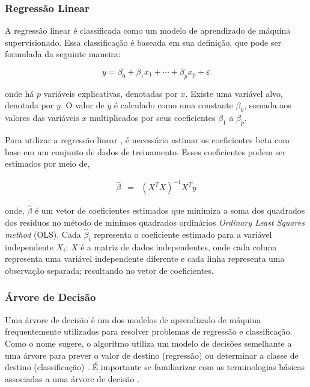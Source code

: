  
 \subsubsection{Regress\~ao Linear}
 
A regressão linear é classificada como um modelo de aprendizado de máquina supervisionado. Essa classificação é baseada em sua definição, que pode ser formulada da seguinte maneira:
 
 \begin{equation}
 	y = \beta_0 + \beta_1 x_1 + \cdots + \beta_p x_p + \varepsilon \label{eq:lr}
 \end{equation}
 
 \noindent onde há $p$ variáveis explicativas, denotadas por $x$. Existe uma variável alvo, denotada por $y$. O valor de $y$ é calculado como uma constante $\beta_0$, somada aos valores das variáveis $x$ multiplicados por seus coeficientes $\beta_1$ a $\beta_p$.
 
 
 Para utilizar a regressão linear \cite{korstanje2021}, é necessário estimar os coeficientes beta com base em um conjunto de dados de treinamento. Esses coeficientes podem ser estimados por meio de,
 
 \begin{eqnarray}
 	\hat{\beta}&=&\left(X^T X\right)^{-1} X^T y\label{eq:ols}
 \end{eqnarray}
 
 \noindent onde, $\hat{\beta}$ é um vetor de coeficientes estimados que minimiza a soma dos quadrados dos resíduos no método de mínimos quadrados ordinários  \textit{Ordinary Least Squares method} (OLS). Cada $\hat{\beta}_i$ representa o coeficiente estimado para a variável independente $X_i$;
 $X$ é a matriz de dados independentes, onde cada coluna representa uma variável independente diferente e cada linha representa uma observação separada;
 resultando no vetor de coeficientes.
 
 
 \subsubsection{\'Arvore de Decis\~ao}
 
 Uma árvore de decisão é um dos modelos de aprendizado de máquina frequentemente utilizados para resolver problemas de regressão e classificação. Como o nome sugere, o algoritmo utiliza um modelo de decisões semelhante a uma árvore para prever o valor de destino (regressão) ou determinar a classe de destino (classificação) \cite{SHI2023110022}. É importante se familiarizar com as terminologias básicas associadas a uma árvore de decisão \cite{SINGHKUSHWAH20223571}.
 
